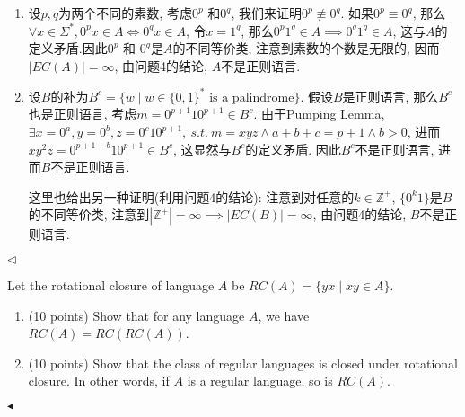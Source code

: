 \documentclass[11pt]{article}
\newenvironment{problem}[2][Problem]{\begin{trivlist}
\item[\hskip \labelsep{\bfseries#1}\hskip\labelsep{\bfseries#2.}]}{\hfill$\blacktriangleleft$\end{trivlist}}
\newenvironment{answer}[1][Answer]{\begin{trivlist}
\item[\hskip \labelsep{\bfseries\itshape#1.}\hskip \labelsep]}{\hfill$\lhd$\end{trivlist}}
\begin{document}
\begin{answer}
    \begin{enumerate}[label = (\alph*)]
        \item 设$p, q$为两个不同的素数, 考虑$0^p$ 和$0^q$, 我们来证明$0^p \not\equiv 0^q$. 如果$0^p \equiv 0^q$, 那么$\forall x \in \Sigma^*, 0^px \in A \Leftrightarrow 0^qx \in A$, 令$x = 1^q$, 那么$0^p1^q \in A \implies 0^q1^q \in A$, 这与$A$的定义矛盾.因此$0^p$ 和 $0^q$是$A$的不同等价类, 注意到素数的个数是无限的, 因而$|EC(A)| = \infty$, 由问题4的结论, $A$不是正则语言.
        \item 设$B$的补为$B^c = \{w\mid w\in \{0, 1\}^*\mbox{ is a palindrome}\}$. 假设$B$是正则语言, 那么$B^c$也是正则语言, 考虑$m = 0^{p+1} 1 0^{p+1} \in B^c$. 由于Pumping Lemma, $\exists x = 0^a, y = 0^b, z = 0^c 1 0^{p+1}, ~s.t.~ m = xyz \land a+b+c = p+1 \land b > 0$, 进而$xy^2z  = 0^{p+1+b} 1 0^{p+1} \in B^c$, 这显然与$B^c$的定义矛盾. 因此$B^c$不是正则语言, 进而$B$不是正则语言.
        
        这里也给出另一种证明(利用问题4的结论): 注意到对任意的$k \in \mathbb{Z}^+$, $\{0^k1\}$是$B$的不同等价类, 注意到$|\mathbb{Z}^+| = \infty \implies |EC(B)| = \infty$, 由问题4的结论, $B$不是正则语言.
    \end{enumerate}
\end{answer}
\begin{problem}{6.(20 points)}
    Let the rotational closure of language $A$ be $RC(A) = \{yx\mid xy \in A\}$.
\begin{enumerate}[label = (\alph*)]
    \item (10 points) Show that for any language $A$, we have $RC(A) = RC(RC(A))$.
    \item (10 points) Show that the class of regular languages is closed under rotational closure. In other words, if $A$ is a regular language, so is $RC(A)$.
\end{enumerate}
\end{problem}
\end{document}
